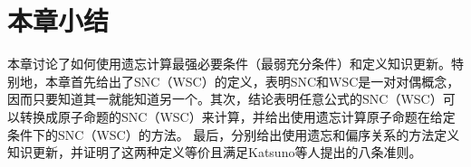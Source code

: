 \section{本章小结}\label{sec:chapter04-conclusion}

本章讨论了如何使用遗忘计算最强必要条件（最弱充分条件）和定义知识更新。特别地，本章首先给出了SNC（WSC）的定义，表明SNC和WSC是一对对偶概念，因而只要知道其一就能知道另一个。其次，结论表明任意公式的SNC（WSC）可以转换成原子命题的SNC（WSC）来计算，并给出使用遗忘计算原子命题在给定条件下的SNC（WSC）的方法。
最后，分别给出使用遗忘和偏序关系的方法定义知识更新，并证明了这两种定义等价且满足Katsuno等人提出的八条准则。

